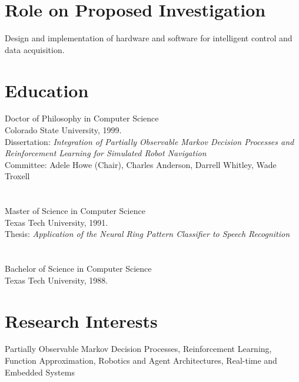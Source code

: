\documentclass[11pt]{resume}
\begin{document}

\pagestyle{fancyplain}
\thispagestyle{empty}

\address{Texas Tech University\\ Computer Science Department \\ Lubbock,
  Texas 79409 \\ (806) 742--3527\\ pyeatt@cs.ttu.edu } \line


\section{Role on Proposed Investigation}
{}
{Design and implementation of hardware and software for intelligent
control and data acquisition.}

\section{Education}
{Doctor of Philosophy in Computer Science}
{\\Colorado State University, 1999. \\
  Dissertation: {\it Integration of Partially Observable Markov Decision
    Processes and Reinforcement Learning for Simulated Robot
    Navigation}\\
  Committee: Adele Howe (Chair), Charles Anderson, Darrell Whitley, Wade
  Troxell }
   
\section{} 
{Master of Science in Computer Science}
{\\Texas Tech University, 1991. \\
  Thesis: {\it Application of the Neural Ring Pattern Classifier to Speech
    Recognition}}

   
\section{} 
{Bachelor of Science in Computer Science} {\\Texas Tech University, 1988.}

\section{Research Interests}  
{} 
{Partially Observable Markov Decision Processes, Reinforcement Learning,
  Function Approximation, Robotics and Agent Architectures, Real-time and
  Embedded Systems }
\end{document}
